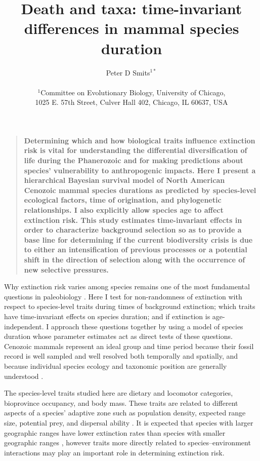 \documentclass[12pt]{article}
\title{Death and taxa: time-invariant differences in mammal species duration}
\author
{Peter D Smits$^{1\ast}$\\
\\
\normalsize{$^{1}$Committee on Evolutionary Biology, University of Chicago,}\\
\normalsize{1025 E. 57th Street, Culver Hall 402, Chicago, IL 60637, USA}\\
}
\date{}
\newenvironment{sciabstract}{%
\begin{quote} \bf}
{\end{quote}}
\begin{document}
 


\baselineskip24pt


\maketitle 


\begin{sciabstract}
  Determining which and how biological traits influence extinction risk is vital for understanding the differential diversification of life during the Phanerozoic and for making predictions about species' vulnerability to anthropogenic impacts. Here I present a hierarchical Bayesian survival model of North American Cenozoic mammal species durations as predicted by species-level ecological factors, time of origination, and phylogenetic relationships. I also explicitly allow species age to affect extinction risk. This study estimates time-invariant effects in order to characterize background selection so as to provide a base line for determining if the current biodiversity crisis is due to either an intensification of previous processes or a potential shift in the direction of selection along with the occurrence of new selective pressures.
\end{sciabstract}

Why extinction risk varies among species remains one of the most fundamental questions in paleobiology \cite{Simpson1944,VanValen1973,Raup1994,Quental2013,Wagner2014b}. Here I test for non-randomness of extinction with respect to species-level traits during times of background extinction; which traits have time-invariant effects on species duration; and if extinction is age-independent. I approach these questions together by using a model of species duration whose parameter estimates act as direct tests of these questions. Cenozoic mammals represent an ideal group and time period because their fossil record is well sampled and well resolved both temporally and spatially, and because individual species ecology and taxonomic position are generally understood \cite{Alroy2009,Liow2008,Smith2004,Quental2013,Simpson1944,Tomiya2013,Marcot2014}. 

The species-level traits studied here are dietary and locomotor categories, bioprovince occupancy, and body mass. These traits are related to different aspects of a species' adaptive zone such as population density, expected range size, potential prey, and dispersal ability \cite{Smith2004,Jernvall2004}. It is expected that species with larger geographic ranges have lower extinction rates than species with smaller geographic ranges \cite{Jablonski1986,Roy2009c}, however traits more directly related to species--environment interactions may play an important role in determining extinction risk. 
\end{document}
